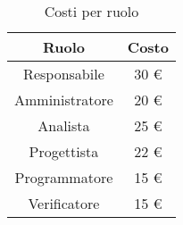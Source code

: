 	\begin{table}[htp]
		\centering
		\caption{Costi per ruolo}
		\begin{tabular}{|c|c|}
			\hline
			\textbf{Ruolo} & \textbf{Costo} \\
			\hline
			Responsabile & 30 \euro \\
			Amministratore & 20 \euro \\
			Analista & 25 \euro \\
			Progettista & 22 \euro \\
			Programmatore & 15 \euro \\
			Verificatore & 15 \euro \\
			\hline
		\end{tabular}
	\end{table}